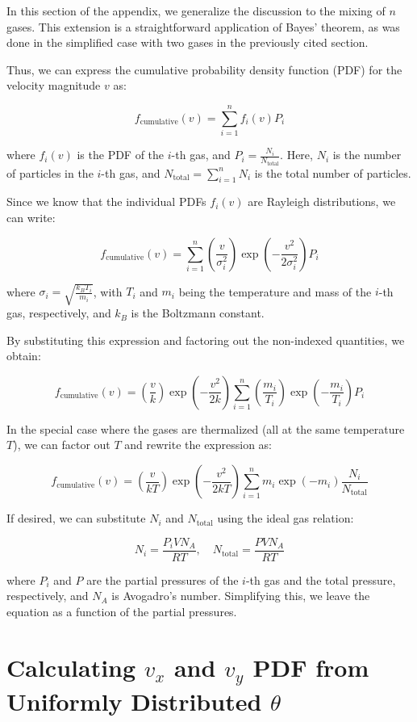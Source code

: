 \documentclass{article}
\begin{document}
In this section of the appendix, we generalize the discussion to the mixing of \(n\) gases. This extension is a straightforward application of Bayes' theorem, as was done in the simplified case with two gases in the previously cited section.

Thus, we can express the cumulative probability density function (PDF) for the velocity magnitude \(v\) as:

\[
f_{\text{cumulative}}(v) = \sum_{i=1}^{n} f_i(v) P_i
\]

where \(f_i(v)\) is the PDF of the \(i\)-th gas, and \(P_i = \frac{N_i}{N_{\text{total}}}\). Here, \(N_i\) is the number of particles in the \(i\)-th gas, and \(N_{\text{total}} = \sum_{i=1}^{n} N_i\) is the total number of particles.

Since we know that the individual PDFs \(f_i(v)\) are Rayleigh distributions, we can write:

\[
f_{\text{cumulative}}(v) = \sum_{i=1}^{n} \left( \frac{v}{\sigma_i^2} \right) \exp\left(-\frac{v^2}{2\sigma_i^2}\right) P_i
\]

where \(\sigma_i = \sqrt{\frac{k_B T_i}{m_i}}\), with \(T_i\) and \(m_i\) being the temperature and mass of the \(i\)-th gas, respectively, and \(k_B\) is the Boltzmann constant.

By substituting this expression and factoring out the non-indexed quantities, we obtain:

\[
f_{\text{cumulative}}(v) = \left( \frac{v}{k} \right) \exp\left(-\frac{v^2}{2k}\right) \sum_{i=1}^{n} \left( \frac{m_i}{T_i} \right) \exp\left(-\frac{m_i}{T_i}\right) P_i
\]

In the special case where the gases are thermalized (all at the same temperature \(T\)), we can factor out \(T\) and rewrite the expression as:

\[
f_{\text{cumulative}}(v) = \left( \frac{v}{kT} \right) \exp\left(-\frac{v^2}{2kT}\right) \sum_{i=1}^{n} m_i \exp\left(-m_i\right) \frac{N_i}{N_{\text{total}}}
\]

If desired, we can substitute \(N_i\) and \(N_{\text{total}}\) using the ideal gas relation:

\[
N_i = \frac{P_i V N_A}{R T}, \quad N_{\text{total}} = \frac{P V N_A}{R T}
\]

where \(P_i\) and \(P\) are the partial pressures of the \(i\)-th gas and the total pressure, respectively, and \(N_A\) is Avogadro's number. Simplifying this, we leave the equation as a function of the partial pressures.


\section{Calculating \(v_x\) and \(v_y\) PDF from Uniformly Distributed \(\theta\)}
\label{sec:appendix}
\end{document}

